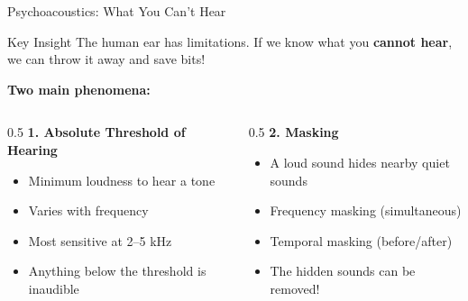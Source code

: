 \documentclass[aspectratio=169,12pt]{beamer}
\begin{document}
\begin{frame}{Psychoacoustics: What You Can't Hear}
    \begin{alertblock}{Key Insight}
        The human ear has limitations. If we know what you \textbf{cannot hear}, we can throw it away and save bits!
    \end{alertblock}
    
    \vspace{0.3cm}
    \textbf{Two main phenomena:}
    
    \vspace{0.2cm}
    \begin{columns}
        \begin{column}{0.5\textwidth}
            \textbf{1. Absolute Threshold of Hearing}
            \begin{itemize}
                \item Minimum loudness to hear a tone
                \item Varies with frequency
                \item Most sensitive at 2--5 kHz
                \item Anything below the threshold is inaudible
            \end{itemize}
        \end{column}
        \begin{column}{0.5\textwidth}
            \textbf{2. Masking}
            \begin{itemize}
                \item A loud sound hides nearby quiet sounds
                \item Frequency masking (simultaneous)
                \item Temporal masking (before/after)
                \item The hidden sounds can be removed!
            \end{itemize}
        \end{column}
    \end{columns}
\end{frame}
\end{document}
